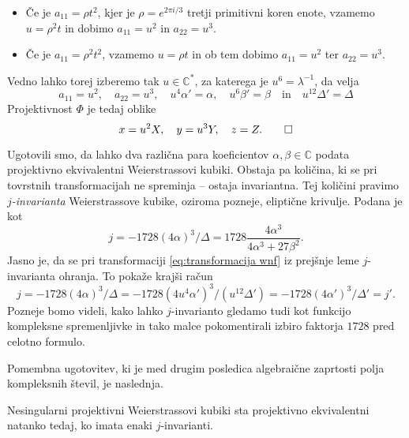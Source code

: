 \documentclass[mat1]{fmfdelo}
\numberwithin{equation}{section}
\newcommand{\C}{\mathbb C}
\newcommand{\CM}{\mathbb C ^*}
\newcommand{\inv}{^{-1}}
\theoremstyle{definition}
\begin{document}
\begin{dokaz}
\begin{itemize}
        \item Če je $a_{11} = \rho t^2$, kjer je $\rho = e^{2\pi i/3}$ tretji primitivni koren enote, vzamemo $u = \rho^2 t$ in dobimo $a_{11} = u^2$ in $a_{22} = u^3$.
        \item Če je $a_{11} = \rho^2 t^2$, vzamemo $u = \rho t$ in ob tem dobimo $a_{11} = u^2$ ter $a_{22} = u^3$.
    \end{itemize}
    Vedno lahko torej izberemo tak $u \in \CM$, za katerega je $u^6 = \lambda\inv$, da velja
    \[
        a_{11} = u^2, \quad a_{22} = u^3, \quad u^4\alpha' = \alpha, \quad u^6 \beta' = \beta \quad \text{in} \quad u^{12} \Delta' = \Delta
    \]
    Projektivnost $\Phi$ je tedaj oblike
    \[
        x = u^2 X, \quad y = u^3 Y, \quad z = Z. \qedhere
    \]
\end{dokaz}

Ugotovili smo, da lahko dva različna para koeficientov $\alpha, \beta \in \C$ podata projektivno ekvivalentni Weierstrassovi kubiki. Obstaja pa količina, ki se pri tovrstnih transformacijah ne spreminja -- ostaja invariantna. Tej količini pravimo \emph{$j$-invarianta} Weierstrassove kubike, oziroma pozneje, eliptične krivulje. Podana je kot 
\[
    j = -1728(4\alpha)^3/\Delta = 1728\frac{4\alpha^3}{4\alpha^3 + 27\beta^2}.  
\] 
Jasno je, da se pri transformaciji \eqref{eq:transformacija wnf} iz prejšnje leme $j$-invarianta ohranja. To pokaže krajši račun
\[
    j = -1728(4\alpha)^3/\Delta = -1728(4u^4\alpha')^3/(u^{12}\Delta') = -1728(4\alpha')^3/\Delta' = j'.
\]
Pozneje bomo videli, kako lahko $j$-invarianto gledamo tudi kot funkcijo kompleksne spremenljivke in tako malce pokomentirali 
izbiro faktorja $1728$ pred celotno formulo.

Pomembna ugotovitev, ki je med drugim posledica algebraične zaprtosti polja kompleksnih števil, je naslednja. 

\begin{trditev}
    \label{proj ekviv iff j enaki}
    Nesingularni projektivni Weierstrassovi kubiki sta projektivno ekvivalentni natanko tedaj, ko imata enaki $j$-invarianti.
\end{trditev}
\end{document}
